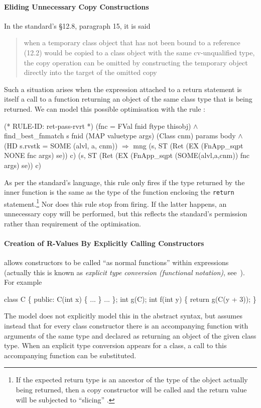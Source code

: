 \documentclass[11pt]{article}
\begin{document}
\paragraph{Eliding Unnecessary Copy Constructions} In the standard's
\S12.8, paragraph 15, it is said
\begin{quote}when a temporary class object that has not been bound to
  a reference (12.2) would be copied to a class object with the same
  cv-unqualified type, the copy operation can be omitted by
  constructing the temporary object directly into the target of the
  omitted copy
\end{quote}
Such a situation arises when the expression attached to a return
statement is itself a call to a function returning an object of the
same class type that is being returned.  We can model this possible
optimisation with the rule :%
\begin{stdrule}
(* RULE-ID: ret-pass-rvrt *)
     (fnc = FVal fnid ftype thisobj) \(\land\)
     find_best_fnmatch s fnid (MAP valuetype args)
                       (Class cnm) params body \(\land\)
     (HD s.rvstk = SOME (alvl, a, cnm))
   \(\Rightarrow\)
     mng (s, ST (Ret (EX (FnApp_sqpt NONE fnc args) se)) c)
         (s, ST (Ret (EX (FnApp_sqpt (SOME(alvl,a,cnm)) fnc
                                     args)
                         se))
                c)
\end{stdrule}
As per the standard's language, this rule only fires if the type
returned by the inner function is the same as the type of the function
enclosing the \texttt{return} statement.\footnote{If the expected
  return type is an ancestor of the type of the object actually being
  returned, then a copy constructor will be called and the return
  value will be subjected to ``slicing''%
.}  Nor does this rule stop
 from firing.  If the latter happens, an
unnecessary copy will be performed, but this reflects the standard's
permission rather than requirement of the optimisation.

\paragraph{Creation of R-Values By Explicitly Calling Constructors}
%
\cpp{} allows constructors to be called ``as normal functions'' within
expressions (actually this is known as \emph{explicit type conversion
  (functional notation)}, see~\cite[\S5.2.3]{cpp-standard-iso14882}).
For example
\begin{stdrule}
   class C \{
   public:
     C(int x) \{ ... \}
     ...
   \};
   int g(C);
   int f(int y)
   \{
      return g(C(y + 3));
   \}
\end{stdrule}
The model does not explicitly model this in the abstract syntax, but
assumes instead that for every class constructor there is an
accompanying function with arguments of the same type and declared as
returning an object of the given class type.  When an explicit type
conversion appears for a class, a call to this accompanying function
can be substituted.
\end{document}
